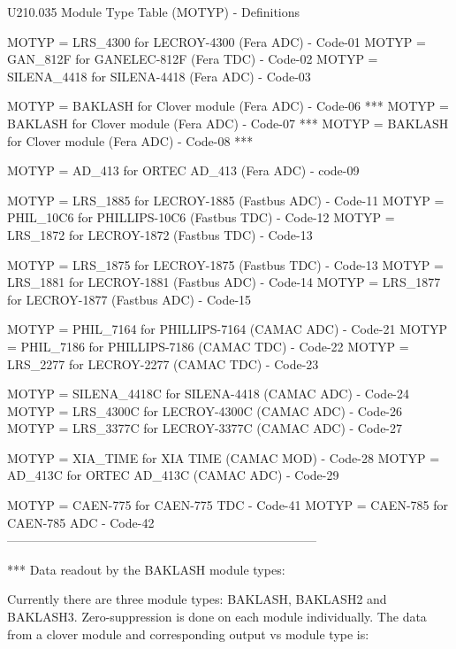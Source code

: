  
   U210.035  Module Type Table (MOTYP) - Definitions
 
   MOTYP = LRS_4300     for LECROY-4300   (Fera    ADC) - Code-01
   MOTYP = GAN_812F     for GANELEC-812F  (Fera    TDC) - Code-02
   MOTYP = SILENA_4418  for SILENA-4418   (Fera    ADC) - Code-03
 
   MOTYP = BAKLASH      for Clover module (Fera    ADC) - Code-06 ***
   MOTYP = BAKLASH      for Clover module (Fera    ADC) - Code-07 ***
   MOTYP = BAKLASH      for Clover module (Fera    ADC) - Code-08 ***
 
   MOTYP = AD_413       for ORTEC AD_413  (Fera    ADC) - code-09
 
   MOTYP = LRS_1885     for LECROY-1885   (Fastbus ADC) - Code-11
   MOTYP = PHIL_10C6    for PHILLIPS-10C6 (Fastbus TDC) - Code-12
   MOTYP = LRS_1872     for LECROY-1872   (Fastbus TDC) - Code-13
 
   MOTYP = LRS_1875     for LECROY-1875   (Fastbus TDC) - Code-13
   MOTYP = LRS_1881     for LECROY-1881   (Fastbus ADC) - Code-14
   MOTYP = LRS_1877     for LECROY-1877   (Fastbus ADC) - Code-15
 
   MOTYP = PHIL_7164    for PHILLIPS-7164 (CAMAC   ADC) - Code-21
   MOTYP = PHIL_7186    for PHILLIPS-7186 (CAMAC   TDC) - Code-22
   MOTYP = LRS_2277     for LECROY-2277   (CAMAC   TDC) - Code-23
 
   MOTYP = SILENA_4418C for SILENA-4418   (CAMAC   ADC) - Code-24
   MOTYP = LRS_4300C    for LECROY-4300C  (CAMAC   ADC) - Code-26
   MOTYP = LRS_3377C    for LECROY-3377C  (CAMAC   ADC) - Code-27
 
   MOTYP = XIA_TIME     for XIA TIME      (CAMAC   MOD) - Code-28
   MOTYP = AD_413C      for ORTEC AD_413C (CAMAC   ADC) - Code-29
 
   MOTYP = CAEN-775     for CAEN-775 TDC                - Code-41
   MOTYP = CAEN-785     for CAEN-785 ADC                - Code-42
   ---------------------------------------------------------------------------
 
   *** Data readout by the BAKLASH module types:
 
   Currently there are three module types:  BAKLASH,  BAKLASH2  and  BAKLASH3.
   Zero-suppression  is  done  on  each  module  individually. The data from a
   clover module and corresponding output vs module type is:
 
